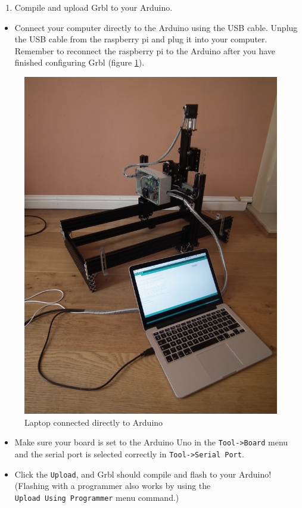 \documentclass[]{book}
\providecommand{\tightlist}{%
  \setlength{\itemsep}{0pt}\setlength{\parskip}{0pt}}
\theoremstyle{definition}
\theoremstyle{definition}
\theoremstyle{definition}
\theoremstyle{remark}
\begin{document}
\begin{enumerate}
\def\labelenumi{\arabic{enumi}.}
\setcounter{enumi}{4}
\tightlist
\item
  Compile and upload Grbl to your Arduino.
\end{enumerate}

\begin{itemize}
\tightlist
\item
  Connect your computer directly to the Arduino using the USB cable.
  Unplug the USB cable from the raspberry pi and plug it into your
  computer. Remember to reconnect the raspberry pi to the Arduino after
  you have finished configuring Grbl (figure \ref{fig:laptop2arduino}).
\end{itemize}

\begin{figure}

{\centering \includegraphics[width=0.75\linewidth]{images/laptop_connected_to_arduino} 

}

\caption{Laptop connected directly to Arduino}\label{fig:laptop2arduino}
\end{figure}

\begin{itemize}
\tightlist
\item
  Make sure your board is set to the Arduino Uno in the
  \texttt{Tool-\textgreater{}Board} menu and the serial port is selected
  correctly in \texttt{Tool-\textgreater{}Serial\ Port}.
\item
  Click the \texttt{Upload}, and Grbl should compile and flash to your
  Arduino! (Flashing with a programmer also works by using the
  \texttt{Upload\ Using\ Programmer} menu command.)
\end{itemize}
\end{document}
